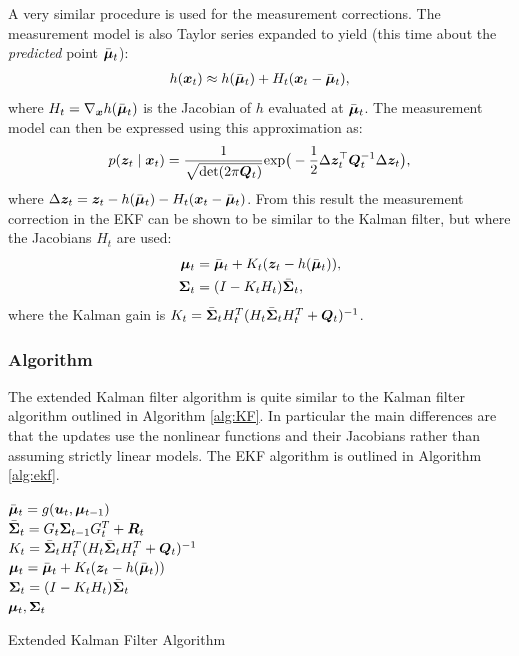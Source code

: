 A very similar procedure is used for the measurement corrections. The measurement model is also Taylor series expanded to yield (this time about the \textit{predicted} point $\bar{\bm{\mu}}_t$):
\begin{equation*}
\begin{split}
h(\bm{x}_t) \approx h(\bar{\bm{\mu}}_t) + H_t (\bm{x}_{t}-\bar{\bm{\mu}}_{t}), \\
\end{split}
\end{equation*}
where $H_t = \nabla_{\bm{x}} h(\bar{\bm{\mu}}_{t})$ is the Jacobian of $h$ evaluated at $\bar{\bm{\mu}}_{t}$. The measurement model can then be expressed using this approximation as:
\begin{equation*}
p(\bm{z}_t \mid \bm{x}_t) = \frac{1}{\sqrt{\text{det}(2\pi \bm{Q}_t)}} \text{exp}\big( -\frac{1}{2}\Delta \bm{z}_t^\top  \bm{Q}_t^{-1} \Delta \bm{z}_t \big),
\end{equation*}
where $\Delta \bm{z}_t = \bm{z}_t-h(\bar{\bm{\mu}}_t) - H_t (\bm{x}_{t}-\bar{\bm{\mu}}_{t})$. From this result the measurement correction in the EKF can be shown to be similar to the Kalman filter, but where the Jacobians $H_t$ are used:
\begin{equation*}
\begin{split}
\bm{\mu}_t &= \bar{\bm{\mu}}_t + K_t(\bm{z}_t - h(\bar{\bm{\mu}}_{t})), \\
\bm{\Sigma}_t &= (I - K_t H_t)\bar{\bm{\Sigma}}_t,
\end{split}
\end{equation*}
where the Kalman gain is $K_t = \bar{\bm{\Sigma}}_{t}H_t^{T}(H_t\bar{\bm{\Sigma}}_{t}H_t^{T}+\bm{Q}_t)^{-1}$.

\subsubsection{Algorithm}
The extended Kalman filter algorithm is quite similar to the Kalman filter algorithm outlined in Algorithm \ref{alg:KF}. In particular the main differences are that the updates use the nonlinear functions and their Jacobians rather than assuming strictly linear models. The EKF algorithm is outlined in Algorithm \ref{alg:ekf}.
\begin{algorithm}[ht]
 $\bar{\bm{\mu}}_t = g(\bm{u}_t,\bm{\mu}_{t-1})$\\
 $\bar{\bm{\Sigma}}_t = G_t\bm{\Sigma}_{t-1} G_t^{T} + \bm{R}_t$\\
 $K_t = \bar{\bm{\Sigma}}_{t}H_t^{T}(H_t\bar{\bm{\Sigma}}_{t}H_t^{T}+\bm{Q}_t)^{-1}$\\
 $\bm{\mu}_t = \bar{\bm{\mu}}_t + K_t(\bm{z}_t - h(\bar{\bm{\mu}}_{t}))$\\
 $\bm{\Sigma}_t = (I - K_t H_t)\bar{\bm{\Sigma}}_t$\\
 \Return $\bm{\mu}_t, \bm{\Sigma}_t$
 \caption{Extended Kalman Filter Algorithm}
 \label{alg:ekf}
\end{algorithm}

